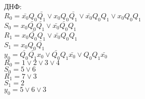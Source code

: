 \documentclass[a4paper,10pt]{article}
\begin{document}
        ДНФ: \\
        $R_0 = \bar{x_0} Q_0 \bar{Q_1} \lor x_0 Q_0 \bar{Q_1} \lor \bar{x_0} Q_0 Q_1 \lor x_0 Q_0 Q_1$ \\
        $S_0 = x_0 \bar{Q_0} \bar{Q_1} \lor \bar{x_0} \bar{Q_0} Q_1$ \\
        $R_1 = x_0 \bar{Q_0} Q_1 \lor \bar{x_0} Q_0 Q_1$ \\
        $S_1 = x_0 Q_0 \bar{Q_1}$ \\
        $y_0 = \bar{Q_0} \bar{Q_1} x_0 \lor \bar{Q_0} Q_1 \bar{x_0} \lor Q_0 Q_1 \bar{x_0}$ \\
		$R_0 = 1 \lor 2 \lor 3 \lor 4 $\\
		$S_0 = 5 \lor 6$ \\
		$R_1 = 7 \lor 3$ \\
		$S_1 = 2$\\
		$y_0 = 5 \lor 6 \lor 3$
\newpage
\end{document}
